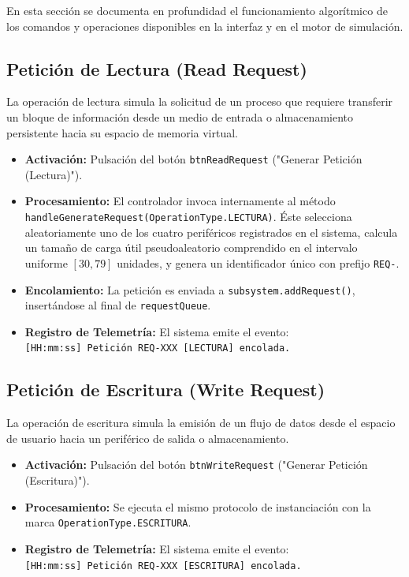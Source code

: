 \documentclass[11pt,letterpaper]{article}
\begin{document}
En esta sección se documenta en profundidad el funcionamiento algorítmico de los comandos y operaciones disponibles en la interfaz y en el motor de simulación.

\subsection{Petición de Lectura (Read Request)}
La operación de lectura simula la solicitud de un proceso que requiere transferir un bloque de información desde un medio de entrada o almacenamiento persistente hacia su espacio de memoria virtual.
\begin{itemize}
    \item \textbf{Activación:} Pulsación del botón \texttt{btnReadRequest} ("Generar Petición (Lectura)").
    \item \textbf{Procesamiento:} El controlador invoca internamente al método \texttt{handleGenerateRequest(OperationType.LECTURA)}. Éste selecciona aleatoriamente uno de los cuatro periféricos registrados en el sistema, calcula un tamaño de carga útil pseudoaleatorio comprendido en el intervalo uniforme $[30, 79]$ unidades, y genera un identificador único con prefijo \texttt{REQ-}.
    \item \textbf{Encolamiento:} La petición es enviada a \texttt{subsystem.addRequest()}, insertándose al final de \texttt{requestQueue}.
    \item \textbf{Registro de Telemetría:} El sistema emite el evento:\\
    \texttt{[HH:mm:ss] Petición REQ-XXX [LECTURA] encolada.}
\end{itemize}

\subsection{Petición de Escritura (Write Request)}
La operación de escritura simula la emisión de un flujo de datos desde el espacio de usuario hacia un periférico de salida o almacenamiento.
\begin{itemize}
    \item \textbf{Activación:} Pulsación del botón \texttt{btnWriteRequest} ("Generar Petición (Escritura)").
    \item \textbf{Procesamiento:} Se ejecuta el mismo protocolo de instanciación con la marca \texttt{OperationType.ESCRITURA}.
    \item \textbf{Registro de Telemetría:} El sistema emite el evento:\\
    \texttt{[HH:mm:ss] Petición REQ-XXX [ESCRITURA] encolada.}
\end{itemize}
\end{document}
